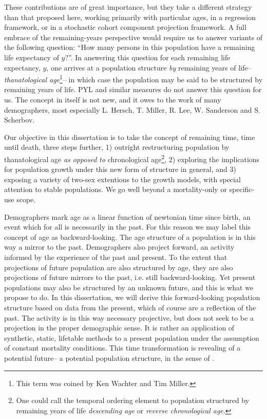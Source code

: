  These contributions are of great importance, but they take a different 
 strategy than that proposed here, working primarily with particular ages, in a 
 regression framework, or in a stochastic cohort component projection framework.
  A full embrace of the remaining-years perspective would require us to answer
  variants of the following question: ``How many persons in this population have
  a remaining life expectancy of $y$?''. In answering this question for each remaining life
 expectancy, $y$, one arrives at a population structure \textit{by} remaining
 years of life-- \textit{thanatological age}\footnote{This term was coined by
 Ken Wachter and Tim Miller.}-- in which case the population may be said to be
 structured by remaining years of life. PYL and similar measures do not 
 answer this question for us. The concept in itself is not new, and it owes to the work of 
 many demographers, most especially L. Hersch, T. Miller, R. Lee, W. Sanderson
 and S. Scherbov.
 
 Our objective in this dissertation is to take the concept of
 remaining time, time until death, three steps further, 1) outright
 restructuring population by thanatological age \textit{as opposed to}
 chronological age\footnote{One could call the temporal ordering element to
 population structured by remaining years of life \textit{descending age} or
 \textit{reverse chronological age}.}, 2) exploring the implications for
 population growth under this new form of structure in general, and 3) exposing 
 a variety of two-sex extentions to the growth models, with special attention 
 to stable populations. We go well beyond a mortality-only or specific-use scope.

Demographers mark age as a linear function of newtonian time since
birth, an event which for all is necessarily in the past. For this reason we may
label this concept of age as backward-looking. The age structure of a population
is in this way a mirror to the past. Demographers also project forward, an activity 
informed by the experience of the past and present. To the
extent that projections of future population are also structured by age,
they are also projections of future mirrors to the past, i.e. still
backward-looking. Yet present populations may also be structured by an unknown
future, and this is what we propose to do. In this dissertation, we will derive
this forward-looking population structure based on data from the present, which of course are a reflection 
of the past. The activity is in this way necessary projective, but does not 
seek to be a projection in the proper demographic sense. It is rather an
application of synthetic, static, lifetable methods to a present population
under the assumption of constant mortality conditions. This time transformation
is revealing of a potential future-- a potential population structure, in the 
sense of \citet{hersch1944demographie}.

